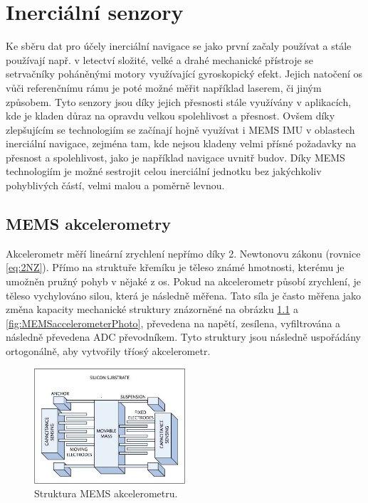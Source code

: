 \chapter{Inerciální senzory}
Ke sběru dat pro účely inerciální navigace se jako první začaly používat a stále používají např. v letectví složité, velké a drahé mechanické přístroje se setrvačníky poháněnými motory využívající gyroskopický efekt. Jejich natočení os vůči referenčnímu rámu je poté možné měřit například laserem, či jiným způsobem. Tyto senzory jsou díky jejich přesnosti stále využívány v aplikacích, kde je kladen důraz na opravdu velkou spolehlivost a přesnost. Ovšem díky zlepšujícím se technologiím se začínají hojně využívat i \ac{MEMS} \ac{IMU} v oblastech inerciální navigace, zejména tam, kde nejsou kladeny velmi přísné požadavky na přesnost a spolehlivost, jako je například navigace uvnitř budov. Díky \ac{MEMS} technologiím je možné sestrojit celou inerciální jednotku bez jakýchkoliv pohyblivých částí, velmi malou a poměrně levnou. \cite{Tittertonc2004} \cite{Grewal2013}

\section{MEMS akcelerometry} \label{MEMSaccel}
Akcelerometr měří lineární zrychlení nepřímo díky 2. Newtonovu zákonu (rovnice \ref{eq:2NZ}). Přímo na struktuře křemíku je těleso známé hmotnosti, kterému je umožněn pružný pohyb v nějaké z os. Pokud na akcelerometr působí zrychlení, je těleso vychylováno silou, která je následně měřena. Tato síla je často měřena jako změna kapacity mechanické struktury znázorněné na obrázku \ref{fig:MEMSaccelerometer} a \ref{fig:MEMSaccelerometerPhoto}, převedena na napětí, zesílena, vyfiltrována a následně převedena \ac{ADC} převodníkem.
Tyto struktury jsou následně uspořádány ortogonálně, aby vytvořily tříosý akcelerometr. \cite{Dadafshar2014}

\begin{figure}[h]
    \centering
    \includegraphics[width=0.5\textwidth]{obrazky/MEMSaccelerometer}
    \caption{Struktura MEMS akcelerometru. \cite{Dadafshar2014}}
    \label{fig:MEMSaccelerometer}
\end{figure}

